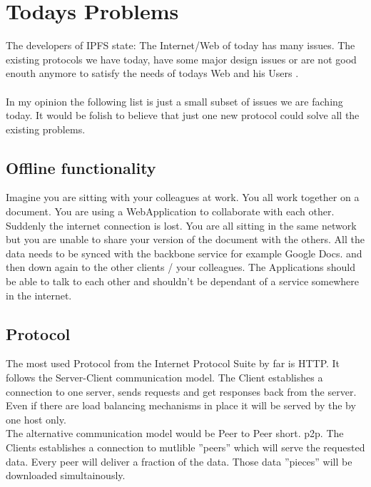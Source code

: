 \documentclass[a4paper,11pt, oneside]{report}
\theoremstyle{definition}
\begin{document}
\chapter{Todays Problems}
The developers of IPFS  state: The Internet/Web of today has many issues.  The existing protocols we have today, have some major design issues or are not good enouth anymore to satisfy the needs of todays Web and his Users \cite{TodaysProblems}.
\\ \\ In my opinion the following list is just a small subset of issues we are faching today. It would be folish to believe that just one new protocol could solve all the existing problems. 


\section{Offline functionality}
Imagine you are sitting with your colleagues at work. You all work together on a document. You are using a WebApplication to collaborate with each other. Suddenly the internet connection is lost. You are all sitting in the same network but you are unable to share your version of the document with the others. All the data needs to be synced with the backbone service for example Google Docs. and then down again to the other clients / your colleagues. The Applications should be able to talk to each other and shouldn't be dependant of a service somewhere in the internet.

\section{Protocol}
The most used Protocol from the Internet Protocol Suite by far is HTTP. It follows the Server-Client communication model. The Client establishes a connection to one server, sends requests and get responses back from the server. Even if there are load balancing mechanisms in place it will be served by the by one host only.\\[0.3cm]
The alternative communication model would be Peer to Peer short. p2p. The Clients establishes a connection to mutlible ''peers'' which will serve the requested data. Every peer will deliver a fraction of the data. Those data ''pieces'' will be downloaded simultainously.

\newpage
\end{document}
